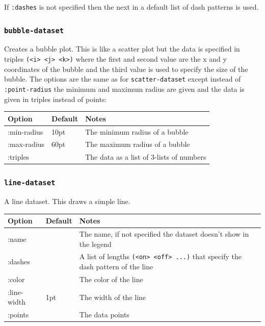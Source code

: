 \documentclass{article}
\begin{document}
If {\tt :dashes} is not specified then the next in a default list of
dash patterns is used.

\subsubsection{\tt bubble-dataset}

Creates a bubble plot.  This is like a scatter plot but the data is
specified in triples {\tt (<i> <j> <k>)} where the first and second
value are the x and y coordinates of the bubble and the third value is
used to specify the size of the bubble.  The options are the same as
for {\tt scatter-dataset} except instead of {\tt :point-radius} the
minimum and maximum radius are given and the data is given in triples
instead of points:

\begin{center}
\begin{tabular}{lll}
Option & Default & Notes \\
\hline
:min-radius & 10pt & The minimum radius of a bubble\\
:max-radius & 60pt & The maximum radius of a bubble\\
:triples & & The data as a list of 3-lists of numbers\\
\end{tabular}
\end{center}

\subsubsection{\tt line-dataset}

A line dataset.  This draws a simple line.

\begin{center}
\begin{tabular}{lll}
Option & Default & Notes \\
\hline
:name & & The name, if not specified the dataset doesn't show in
the legend\\
:dashes & & A list of lengths {\tt (<on> <off> ...)} that specify the
dash pattern of the line\\
:color & & The color of the line\\
:line-width & 1pt & The width of the line\\
:points & & The data points\\
\end{tabular}
\end{center}
\end{document}
